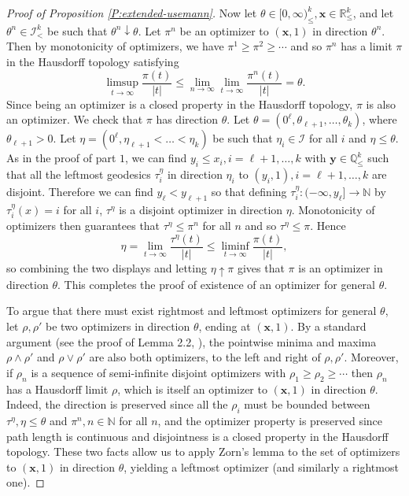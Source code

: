 \documentclass[11pt]{article}
\newcommand{\Q}{\mathbb{Q}}
\newcommand{\N}{\mathbb{N}}
\newcommand{\R}{\mathbb{R}}
\newcommand{\cI}{\mathcal{I}}
\newcommand{\cvgdown}{\downarrow}
\newcommand{\bx}{\mathbf{x}}
\newcommand{\by}{\mathbf{y}}
\theoremstyle{definition} %
\theoremstyle{remark} %
\begin{document}
\begin{proof}[Proof of Proposition \ref{P:extended-usemann}]
	Now let $\theta \in [0, \infty)^k_\le, \bx \in \R^k_\le$, and let $\theta^n \in \cI^k_<$ be such that $\theta^n \cvgdown \theta$. Let $\pi^n$ be an optimizer to $(\bx, 1)$ in direction $\theta^n$. Then by monotonicity of optimizers, we have $\pi^1 \ge \pi^2 \ge \cdots$ and so $\pi^n$ has a limit $\pi$ in the Hausdorff topology satisfying
	$$
	\limsup_{t \to \infty} \frac{\pi(t)}{|t|} \le \lim_{n \to \infty} \lim_{t \to \infty}  \frac{\pi^n(t)}{|t|} = \theta.
	$$
	Since being an optimizer is a closed property in the Hausdorff topology, $\pi$ is also an optimizer. We check that $\pi$ has direction $\theta$. Let $\theta = (0^\ell, \theta_{\ell+ 1}, \dots, \theta_k)$, where $\theta_{\ell+ 1} > 0$. Let $\eta = (0^\ell, \eta_{\ell+1} < \dots < \eta_k)$ be such that $\eta_i \in \cI$ for all $i$ and $\eta \le \theta$. As in the proof of part $1$, we can find $y_i \le x_i, i = \ell + 1, \dots, k$ with $\by \in \Q^k_\le$ such that all the leftmost geodesics $\tau^\eta_i$ in direction $\eta_i$ to $(y_i, 1), i = \ell + 1, \dots, k$ are disjoint. Therefore we can find $y_\ell < y_{\ell + 1}$ so that defining $\tau^\eta_i:(-\infty, y_\ell] \to \N$ by $\tau^\eta_i(x) = i$ for all $i$, $\tau^\eta$ is a disjoint optimizer in direction $\eta$. Monotonicity of optimizers then guarantees that $\tau^\eta \le \pi^n$ for all $n$ and so $\tau^\eta \le \pi$. Hence
	$$
	\eta = \lim_{t \to \infty} \frac{\tau^\eta(t)}{|t|} \le \liminf_{t \to \infty} \frac{\pi(t)}{|t|},
	$$
	so combining the two displays and letting $\eta \uparrow \pi$ gives that $\pi$ is an optimizer in direction $\theta$. This completes the proof of existence of an optimizer for general $\theta$.
	
	To argue that there must exist rightmost and leftmost optimizers for general $\theta$, let $\rho, \rho'$ be two optimizers in direction $\theta$, ending at $(\bx, 1)$. By a standard argument (see the proof of Lemma 2.2, \cite{dauvergne2021disjoint}), the pointwise minima and maxima $\rho \wedge \rho'$ and $\rho \vee \rho'$ are also both optimizers, to the left and right of $\rho, \rho'$. Moreover, if $\rho_n$ is a sequence of semi-infinite disjoint optimizers with $\rho_1 \ge \rho_2 \ge \cdots$ then $\rho_n$ has a Hausdorff limit $\rho$, which is itself an optimizer to $(\bx, 1)$ in direction $\theta$. Indeed, the direction is preserved since all the $\rho_i$ must be bounded between $\tau^\eta, \eta \le \theta$ and $\pi^n, n \in \N$ for all $n$, and the optimizer property is preserved since path length is continuous and disjointness is a closed property in the Hausdorff topology. These two facts allow us to apply Zorn's lemma to the set of optimizers to $(\bx, 1)$ in direction $\theta$, yielding a leftmost optimizer (and similarly a rightmost one).
\end{proof}
\end{document}
